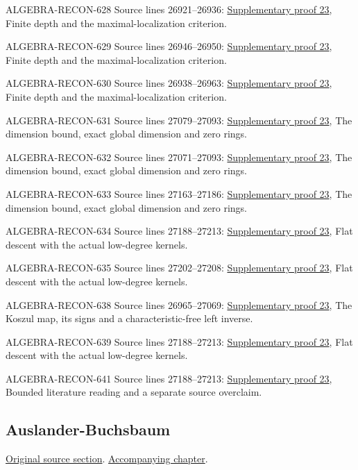 \begin{AlgebraSourceRoutes}
\item[ALGEBRA-RECON-628] Source lines 26921--26936: \hyperlink{algebra_regular_ab_notes_20260928}{Supplementary proof 23}, Finite depth and the maximal-localization criterion.
\item[ALGEBRA-RECON-629] Source lines 26946--26950: \hyperlink{algebra_regular_ab_notes_20260928}{Supplementary proof 23}, Finite depth and the maximal-localization criterion.
\item[ALGEBRA-RECON-630] Source lines 26938--26963: \hyperlink{algebra_regular_ab_notes_20260928}{Supplementary proof 23}, Finite depth and the maximal-localization criterion.
\item[ALGEBRA-RECON-631] Source lines 27079--27093: \hyperlink{algebra_regular_ab_notes_20260928}{Supplementary proof 23}, The dimension bound, exact global dimension and zero rings.
\item[ALGEBRA-RECON-632] Source lines 27071--27093: \hyperlink{algebra_regular_ab_notes_20260928}{Supplementary proof 23}, The dimension bound, exact global dimension and zero rings.
\item[ALGEBRA-RECON-633] Source lines 27163--27186: \hyperlink{algebra_regular_ab_notes_20260928}{Supplementary proof 23}, The dimension bound, exact global dimension and zero rings.
\item[ALGEBRA-RECON-634] Source lines 27188--27213: \hyperlink{algebra_regular_ab_notes_20260928}{Supplementary proof 23}, Flat descent with the actual low-degree kernels.
\item[ALGEBRA-RECON-635] Source lines 27202--27208: \hyperlink{algebra_regular_ab_notes_20260928}{Supplementary proof 23}, Flat descent with the actual low-degree kernels.
\item[ALGEBRA-RECON-638] Source lines 26965--27069: \hyperlink{algebra_regular_ab_notes_20260928}{Supplementary proof 23}, The Koszul map, its signs and a characteristic-free left inverse.
\item[ALGEBRA-RECON-639] Source lines 27188--27213: \hyperlink{algebra_regular_ab_notes_20260928}{Supplementary proof 23}, Flat descent with the actual low-degree kernels.
\item[ALGEBRA-RECON-641] Source lines 27188--27213: \hyperlink{algebra_regular_ab_notes_20260928}{Supplementary proof 23}, Bounded literature reading and a separate source overclaim.
\end{AlgebraSourceRoutes}

\subsection{Auslander-Buchsbaum}
\hypertarget{algebra-source-section-Auslander-Buchsbaum}{}
\noindent\href{https://github.com/stacks/stacks-project/blob/a04446e57ec1fbc252a871afcec7752fb2807b14/algebra.tex\#L27222}{Original source section}. \href{algebra.pdf\#nameddest=section-Auslander-Buchsbaum}{Accompanying chapter}.

